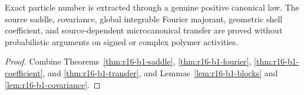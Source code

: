 \begin{theorem}
\label{thm:r16-b1-main}
Exact particle number is extracted through a genuine positive canonical law.
The source saddle, covariance, global integrable Fourier majorant, geometric
shell coefficient, and source-dependent microcanonical transfer are proved
without probabilistic arguments on signed or complex polymer activities.
\end{theorem}

\begin{proof}
Combine Theorems~\ref{thm:r16-b1-saddle},
\ref{thm:r16-b1-fourier}, \ref{thm:r16-b1-coefficient}, and
\ref{thm:r16-b1-transfer}, and
Lemmas~\ref{lem:r16-b1-blocks} and \ref{lem:r16-b1-covariance}.
\end{proof}
